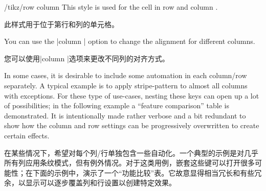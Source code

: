 \begin{stylekey}{/tikz/row  column }
    This style is used for the cell in row  and column
    .

    此样式用于位于第行和列的单元格。

  \end{stylekey}
%
\begin{codeexample}[]
\end{codeexample}

You can use the |column | option to change the alignment for
different columns.

您可以使用|column |选项来更改不同列的对齐方式。

%
\begin{codeexample}[]
\end{codeexample}

In some cases, it is desirable to include some automation in each column/row
separately. A typical example is to apply stripe-pattern to almost all columns
with exceptions. For these type of use-cases, nesting these keys can open up
a lot of possibilities; in the following example a ``feature comparison'' table
is demonstrated. It is intentionally made rather verbose and a bit redundant
to show how the column and row settings can be progressively overwritten to
create certain effects.

在某些情况下，希望对每个列/行单独包含一些自动化。一个典型的示例是对几乎所有列应用条纹模式，但有例外情况。对于这类用例，嵌套这些键可以打开很多可能性；在下面的示例中，演示了一个“功能比较”表。它故意显得相当冗长和有些冗余，以显示可以逐步覆盖列和行设置以创建特定效果。

